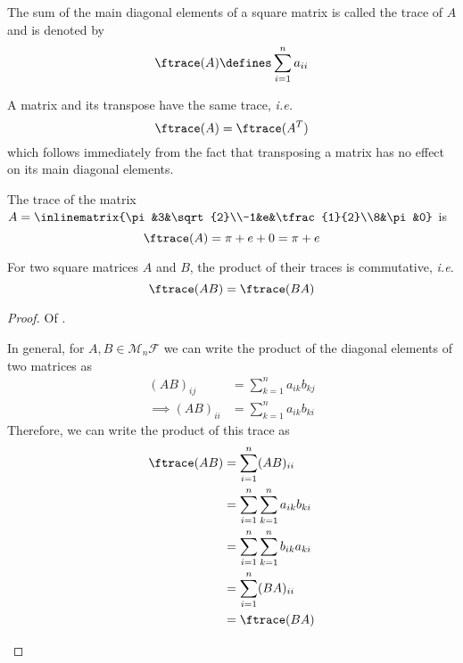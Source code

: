 \begin{definition}\label{def-matrix-trace}
	The sum of the main diagonal elements of a square matrix is called the trace
	of $A$ and is denoted by
	\begin{equation}
		\ftrace(A)\defines\sum_{i=1}^n a_{ii}
	\end{equation}
\end{definition}

\begin{rem}\label{rem-trace-of-transposed}
	A matrix and its transpose have the same trace, \textit{i.e.}
	\begin{equation}
		\ftrace(A)=\ftrace(A^T)
	\end{equation}
	which follows immediately from the fact that transposing a matrix has no effect
	on its main diagonal elements.
\end{rem}

\begin{exm}
	The trace of the matrix $A=\inlinematrix{\pi&3&\sqrt{2}\\-1&e&\tfrac{1}{2}\\8&\pi&0}$ is
	\begin{equation*}
		\ftrace(A)=\pi + e + 0 = \pi + e
	\end{equation*}
\end{exm}

\begin{thm}\label{thm-trace-product-commutative}
	For two square matrices $A$ and $B$, the product of their traces is commutative,
	\textit{i.e.}
	\begin{equation}
		\ftrace(AB)=\ftrace(BA)
	\end{equation}
\end{thm}

\begin{proof}
	Of .
	\begin{flushleft}
		In general, for $A,B\in\mathcal{M}_n{\mathcal{F}}$ we can write the product
		of the diagonal elements of two matrices as
		\begin{align*}
			(AB)_{ij}          & = \sum_{k=1}^n a_{ik}b_{kj} \\
			\implies (AB)_{ii} & = \sum_{k=1}^n a_{ik}b_{ki}
		\end{align*}
		Therefore, we can write the product of this trace as
		\begin{align*}
			\ftrace(AB) & = \sum_{i=1}^n (AB)_{ii}                 \\
			            & = \sum_{i=1}^n \sum_{k=1}^n a_{ik}b_{ki} \\
			            & = \sum_{i=1}^n \sum_{k=1}^n b_{ik}a_{ki} \\
			            & = \sum_{i=1}^n (BA)_{ii}                 \\
			            & = \ftrace(BA)
		\end{align*}
	\end{flushleft}
\end{proof}

